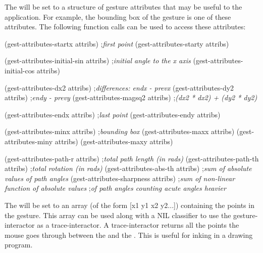 The  will be set to a structure of gesture attributes that may
be useful to the application.  For example, the bounding box of the gesture
is one of these attributes.  The following function calls can be used to
access these attributes:
\begin{programexample}
(gest-attributes-startx attribs)        ;{\it first point}
(gest-attributes-starty attribs)

(gest-attributes-initial-sin attribs)   ;{\it initial angle to the x axis}
(gest-attributes-initial-cos attribs)

(gest-attributes-dx2 attribs)           ;{\it differences: endx - prevx}
(gest-attributes-dy2 attribs)           ;{\it                    endy - prevy}
(gest-attributes-magsq2 attribs)        ;{\it (dx2 * dx2) + (dy2 * dy2)}

(gest-attributes-endx attribs)          ;{\it last point}
(gest-attributes-endy attribs)

(gest-attributes-minx attribs)          ;{\it bounding box}
(gest-attributes-maxx attribs)
(gest-attributes-miny attribs)
(gest-attributes-maxy attribs)

(gest-attributes-path-r attribs)        ;{\it total path length (in rads)}
(gest-attributes-path-th attribs)       ;{\it total rotation (in rads)}
(gest-attributes-abs-th attribs)        ;{\it sum of absolute values of path angles}
(gest-attributes-sharpness attribs)     ;{\it sum of non-linear function of absolute values}
                                        ;{\it of path angles counting acute angles heavier}
\end{programexample}

The  will be set to an array (of the form
[x1 y1 x2 y2...]) containing the points in the gesture. This array can
be used along with a NIL classifier to use the gesture-interactor as a
trace-interactor.  A trace-interactor returns all the points the
mouse goes through between the  and the .
This is useful for inking in a drawing program.

